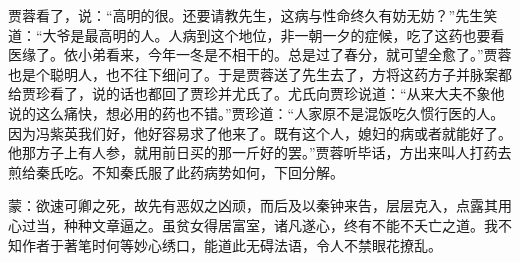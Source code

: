 \begin{parag}
    贾蓉看了，说：“高明的很。还要请教先生，这病与性命终久有妨无妨？”先生笑道：“大爷是最高明的人。人病到这个地位，非一朝一夕的症候，吃了这药也要看医缘了。依小弟看来，今年一冬是不相干的。总是过了春分，就可望全愈了。”贾蓉也是个聪明人，也不往下细问了。于是贾蓉送了先生去了，方将这药方子并脉案都给贾珍看了，说的话也都回了贾珍并尤氏了。尤氏向贾珍说道：“从来大夫不象他说的这么痛快，想必用的药也不错。”贾珍道：“人家原不是混饭吃久惯行医的人。因为冯紫英我们好，他好容易求了他来了。既有这个人，媳妇的病或者就能好了。他那方子上有人参，就用前日买的那一斤好的罢。”贾蓉听毕话，方出来叫人打药去煎给秦氏吃。不知秦氏服了此药病势如何，下回分解。
\end{parag}


\begin{parag}
    \begin{note}蒙：欲速可卿之死，故先有恶奴之凶顽，而后及以秦钟来告，层层克入，点露其用心过当，种种文章逼之。虽贫女得居富室，诸凡遂心，终有不能不夭亡之道。我不知作者于著笔时何等妙心绣口，能道此无碍法语，令人不禁眼花撩乱。\end{note}
\end{parag}
